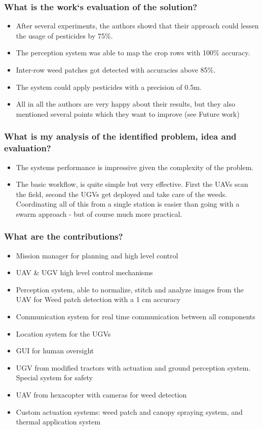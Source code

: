 \documentclass{article}
\begin{document}
\subsubsection*{What is the work`s evaluation of the solution?}
\begin{itemize}
    \item After several experiments, the authors showd that their approach could lessen the usage of pesticides by 75\%.
    \item The perception system was able to map the crop rows with 100\% accuracy.
    \item Inter-row weed patches got detected with accuracies above 85\%.
    \item The system could apply pesticides with a precision of 0.5m.
    \item All in all the authors are very happy about their results, but they also mentioned several points which they want to improve (see Future work)
\end{itemize}
\subsubsection*{What is my analysis of the identified problem, idea and evaluation?}
\begin{itemize}
    \item The systems performance is impressive given the complexity of the problem. 
    \item The basic workflow, is quite simple but very effective. First the UAVs scan the field, second the UGVs get deployed and take care of the weeds. Coordinating all of this from a single station is easier than going with a swarm approach - but of course much more practical. 
\end{itemize}
\subsubsection*{What are the contributions?}
\begin{itemize}
    \item Mission manager for planning and high level control
    \item UAV \& UGV high level control mechanisms
    \item Perception system, able to normalize, stitch and analyze images from the UAV for Weed patch detection with a 1 cm accuracy
    \item Communication system for real time communication between all components
    \item Location system for the UGVs
    \item GUI for human oversight
    \item UGV from modified tractors with actuation and ground perception system. Special system for safety
    \item UAV from hexacopter with cameras for weed detection 
    \item Custom actuation systems: weed patch and canopy spraying system, and thermal application system
\end{itemize}
\end{document}

